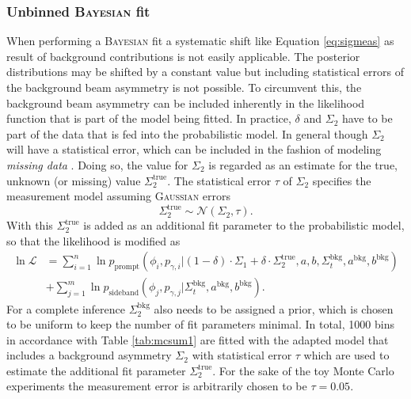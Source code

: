 \subsubsection{Unbinned \textsc{Bayesian} fit}
When performing a \textsc{Bayesian} fit a systematic shift like Equation \eqref{eq:sigmeas} as result of background contributions is not easily applicable. The posterior distributions may be shifted by a constant value but including statistical errors of the background beam asymmetry is not possible. To circumvent this, the background beam asymmetry can be included inherently in the likelihood function that is part of the model being fitted. In practice, $\delta$ and $\Sigma_2$ have to be part of the data that is fed into the probabilistic model. In general though $\Sigma_2$ will have a statistical error, which can be included in the fashion of modeling \emph{missing data} \cite{stan}. Doing so, the value for $\Sigma_2$ is regarded as an estimate for the true, unknown (or missing) value $\Sigma_2^\text{true}$. The statistical error $\tau$ of $\Sigma_2$ specifies the measurement model assuming \textsc{Gaussian} errors 
\begin{equation}
	\Sigma_2^\text{true}\sim\mathcal{N}\left(\Sigma_2,\tau\right).
\end{equation}
 With this $\Sigma_2^\text{true}$ is added as an additional fit parameter to the probabilistic model, so that the  likelihood is modified as  
 \begin{equation}
 	\begin{aligned}
 		\ln\mathcal{L}&=\sum_{i=1}^{n}\ln p_\text{prompt}\left(\phi_i,p_{\gamma,i}\big|(1-\delta)\cdot\Sigma_1+\delta\cdot\Sigma_2^\text{true},a,b,\Sigma^\text{bkg}_t,a^\text{bkg},b^\text{bkg}\right)\\&+\sum_{j=1}^m \ln p_\text{sideband}\left(\phi_j,p_{\gamma,j}\big|\Sigma^\text{bkg}_t,a^\text{bkg},b^\text{bkg}\right).\label{eq:likalt}
 	\end{aligned}
 \end{equation}
For a complete inference $\Sigma_2^\text{bkg}$ also needs to be assigned a prior, which is chosen to be uniform to keep the number of fit parameters minimal. \newpage \noindent In total, 1000 bins in accordance with Table \ref{tab:mcsum1} are fitted with the adapted model that includes a background asymmetry $\Sigma_2$ with statistical error $\tau$ which are used to estimate the additional fit parameter $\Sigma_2^\text{true}$. For the sake of the toy Monte Carlo experiments the measurement error is arbitrarily chosen to be $\tau=0.05$.



